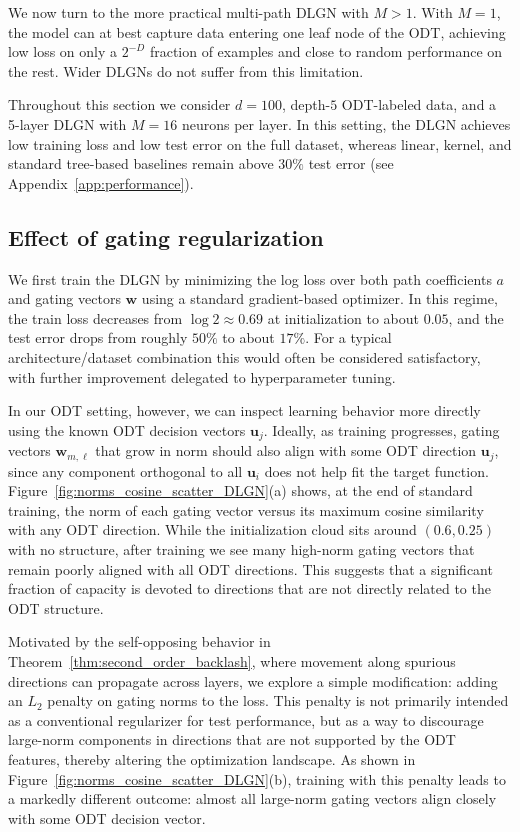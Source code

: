 \documentclass{article}
\theoremstyle{plain}
\theoremstyle{definition}
\theoremstyle{remark}
\newcommand{\1}{{\mathbf 1}}
\newcommand{\0}{{\mathbf 0}}
\newcommand{\w}{{\mathbf w}}
\newcommand{\bu}{{\mathbf u}}
\renewcommand{\>}{{\rightarrow}}
\begin{document}
We now turn to the more practical multi-path DLGN with $M>1$. With $M=1$, the model can at best capture data entering one leaf node of the ODT, achieving low loss on only a $2^{-D}$ fraction of examples and close to random performance on the rest. Wider DLGNs do not suffer from this limitation.

Throughout this section we consider $d=100$, depth-$5$ ODT-labeled data, and a 5-layer DLGN with $M=16$ neurons per layer. In this setting, the DLGN achieves low training loss and low test error on the full dataset, whereas linear, kernel, and standard tree-based baselines remain above $30\%$ test error (see Appendix~\ref{app:performance}).

\subsection{Effect of gating regularization}
\label{sec:gating_regularization}

We first train the DLGN by minimizing the log loss over both path coefficients $a$ and gating vectors $\w$ using a standard gradient-based optimizer. In this regime, the train loss decreases from $\log 2 \approx 0.69$ at initialization to about $0.05$, and the test error drops from roughly $50\%$ to about $17\%$. For a typical architecture/dataset combination this would often be considered satisfactory, with further improvement delegated to hyperparameter tuning.

In our ODT setting, however, we can inspect learning behavior more directly using the known ODT decision vectors $\bu_j$. Ideally, as training progresses, gating vectors $\w_{m,\ell}$ that grow in norm should also align with some ODT direction $\bu_j$, since any component orthogonal to all $\bu_i$ does not help fit the target function. Figure~\ref{fig:norms_cosine_scatter_DLGN}(a) shows, at the end of standard training, the norm of each gating vector versus its maximum cosine similarity with any ODT direction. While the initialization cloud sits around $(0.6,0.25)$ with no structure, after training we see many high-norm gating vectors that remain poorly aligned with all ODT directions. This suggests that a significant fraction of capacity is devoted to directions that are not directly related to the ODT structure.

Motivated by the self-opposing behavior in Theorem~\ref{thm:second_order_backlash}, where movement along spurious directions can propagate across layers, we explore a simple modification: adding an $L_2$ penalty on gating norms to the loss. This penalty is not primarily intended as a conventional regularizer for test performance, but as a way to discourage large-norm components in directions that are not supported by the ODT features, thereby altering the optimization landscape. As shown in Figure~\ref{fig:norms_cosine_scatter_DLGN}(b), training with this penalty leads to a markedly different outcome: almost all large-norm gating vectors align closely with some ODT decision vector.
\end{document}
